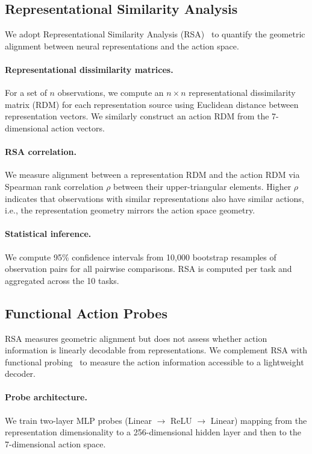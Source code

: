 \subsection{Representational Similarity Analysis}
\label{sec:rsa}

We adopt Representational Similarity Analysis (RSA)~\cite{kriegeskorte2008} to quantify the geometric alignment between neural representations and the action space.

\paragraph{Representational dissimilarity matrices.}
For a set of $n$ observations, we compute an $n \times n$ representational dissimilarity matrix (RDM) for each representation source using Euclidean distance between representation vectors.
We similarly construct an action RDM from the 7-dimensional action vectors.

\paragraph{RSA correlation.}
We measure alignment between a representation RDM and the action RDM via Spearman rank correlation $\rho$ between their upper-triangular elements.
Higher $\rho$ indicates that observations with similar representations also have similar actions, i.e., the representation geometry mirrors the action space geometry.

\paragraph{Statistical inference.}
We compute 95\% confidence intervals from 10{,}000 bootstrap resamples of observation pairs for all pairwise comparisons.
RSA is computed per task and aggregated across the 10 tasks.

\subsection{Functional Action Probes}
\label{sec:probes}

RSA measures geometric alignment but does not assess whether action information is linearly decodable from representations.
We complement RSA with functional probing~\cite{alain2017} to measure the action information accessible to a lightweight decoder.

\paragraph{Probe architecture.}
We train two-layer MLP probes (Linear $\to$ ReLU $\to$ Linear) mapping from the representation dimensionality to a 256-dimensional hidden layer and then to the 7-dimensional action space.

